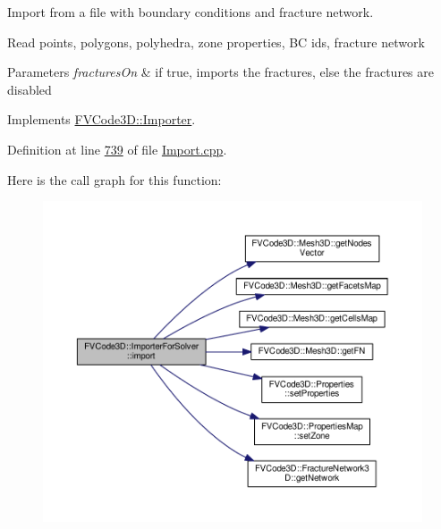 Import from a file with boundary conditions and fracture network. 

Read points, polygons, polyhedra, zone properties, BC ids, fracture network 
\begin{DoxyParams}{Parameters}
{\em fractures\+On} & if true, imports the fractures, else the fractures are disabled \\
\hline
\end{DoxyParams}


Implements \hyperlink{classFVCode3D_1_1Importer_aee8e68c30c3fd4a01f10a5a4365b30ea}{F\+V\+Code3\+D\+::\+Importer}.



Definition at line \hyperlink{Import_8cpp_source_l00739}{739} of file \hyperlink{Import_8cpp_source}{Import.\+cpp}.



Here is the call graph for this function\+:
\nopagebreak
\begin{figure}[H]
\begin{center}
\leavevmode
\includegraphics[width=350pt]{classFVCode3D_1_1ImporterForSolver_a4ad5aee92b6abe9b6ed5150c707a83ad_cgraph}
\end{center}
\end{figure}


